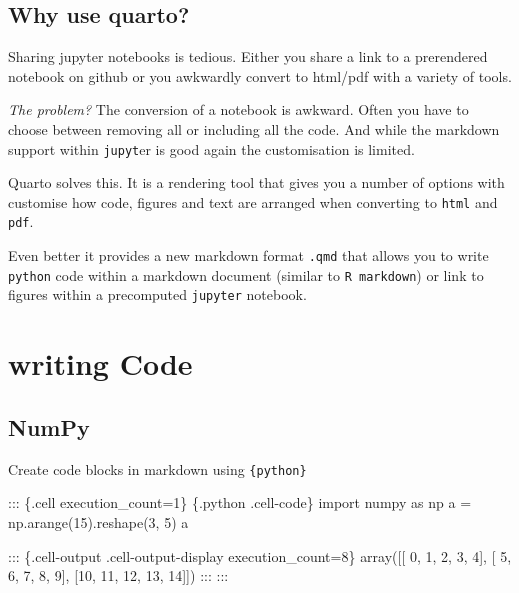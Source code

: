 \documentclass[
  letterpaper,
  DIV=11,
  numbers=noendperiod,
  oneside]{scrartcl}
\newenvironment{Shaded}{\begin{snugshade}}{\end{snugshade}}
\newcommand{\DecValTok}[1]{\textcolor[rgb]{0.68,0.00,0.00}{#1}}
\newcommand{\ImportTok}[1]{\textcolor[rgb]{0.00,0.46,0.62}{#1}}
\newcommand{\InformationTok}[1]{\textcolor[rgb]{0.37,0.37,0.37}{#1}}
\newcommand{\NormalTok}[1]{\textcolor[rgb]{0.00,0.23,0.31}{#1}}
\newcommand{\OperatorTok}[1]{\textcolor[rgb]{0.37,0.37,0.37}{#1}}
\begin{document}
\hypertarget{why-use-quarto}{%
\subsection{Why use quarto?}\label{why-use-quarto}}

Sharing jupyter notebooks is tedious. Either you share a link to a
prerendered notebook on github or you awkwardly convert to html/pdf with
a variety of tools.

\emph{The problem?} The conversion of a notebook is awkward. Often you
have to choose between removing all or including all the code. And while
the markdown support within \texttt{jupyt}er is good again the
customisation is limited.

Quarto solves this. It is a rendering tool that gives you a number of
options with customise how code, figures and text are arranged when
converting to \texttt{html} and \texttt{pdf}.

Even better it provides a new markdown format \texttt{.qmd} that allows
you to write \texttt{python} code within a markdown document (similar to
\texttt{R\ markdown}) or link to figures within a precomputed
\texttt{jupyter} notebook.

\hypertarget{writing-code}{%
\section{writing Code}\label{writing-code}}

\hypertarget{numpy}{%
\subsection{NumPy}\label{numpy}}

Create code blocks in markdown using
\texttt{\textasciigrave{}\textasciigrave{}\textasciigrave{}\{python\}}

\begin{Shaded}
\begin{Highlighting}[]

\NormalTok{::: \{.cell execution\_count=1\}}
\InformationTok{\textasciigrave{}\textasciigrave{}\textasciigrave{} \{.python .cell{-}code\}}
\ImportTok{import}\NormalTok{ numpy }\ImportTok{as}\NormalTok{ np}
\NormalTok{a }\OperatorTok{=}\NormalTok{ np.arange(}\DecValTok{15}\NormalTok{).reshape(}\DecValTok{3}\NormalTok{, }\DecValTok{5}\NormalTok{)}
\NormalTok{a}
\InformationTok{\textasciigrave{}\textasciigrave{}\textasciigrave{}}

\NormalTok{::: \{.cell{-}output .cell{-}output{-}display execution\_count=8\}}
\InformationTok{\textasciigrave{}\textasciigrave{}\textasciigrave{}}
\InformationTok{array([[ 0,  1,  2,  3,  4],}
\InformationTok{       [ 5,  6,  7,  8,  9],}
\InformationTok{       [10, 11, 12, 13, 14]])}
\InformationTok{\textasciigrave{}\textasciigrave{}\textasciigrave{}}
\NormalTok{:::}
\NormalTok{:::}

\end{Highlighting}
\end{Shaded}
\end{document}
